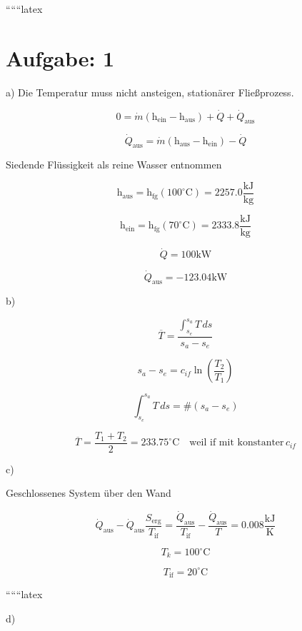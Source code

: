 
``````latex


\section*{Aufgabe: 1}

a) Die Temperatur muss nicht ansteigen, stationärer Fließprozess.

\[
0 = \dot{m} (\text{h}_{\text{ein}} - \text{h}_{\text{aus}}) + \dot{Q} + \dot{Q}_{\text{aus}}
\]

\[
\dot{Q}_{\text{aus}} = \dot{m} (\text{h}_{\text{aus}} - \text{h}_{\text{ein}}) - \dot{Q}
\]

Siedende Flüssigkeit als reine Wasser entnommen

\[
\text{h}_{\text{aus}} = \text{h}_{\text{fg}} (100^\circ \text{C}) = 2257.0 \frac{\text{kJ}}{\text{kg}}
\]

\[
\text{h}_{\text{ein}} = \text{h}_{\text{fg}} (70^\circ \text{C}) = 2333.8 \frac{\text{kJ}}{\text{kg}}
\]

\[
\dot{Q} = 100 \text{kW}
\]

\[
\dot{Q}_{\text{aus}} = -123.04 \text{kW}
\]

b)

\[
\overline{T} = \frac{\int_{s_e}^{s_a} T \, ds}{s_a - s_e}
\]

\[
s_a - s_e = c_{if} \ln \left( \frac{T_2}{T_1} \right)
\]

\[
\int_{s_e}^{s_a} T \, ds = \# (s_a - s_e)
\]

\[
\overline{T} = \frac{T_1 + T_2}{2} = 233.75^\circ \text{C} \quad \text{weil if mit konstanter} \, c_{if}
\]

c)

Geschlossenes System über den Wand

\[
\dot{Q}_{\text{aus}} - \dot{Q}_{\text{aus}} \frac{S_{\text{erg}}}{T_{\text{if}}} = \frac{\dot{Q}_{\text{aus}}}{T_{\text{if}}} - \frac{\dot{Q}_{\text{aus}}}{T} = 0.008 \frac{\text{kJ}}{\text{K}}
\]

\[
T_k = 100^\circ \text{C}
\]

\[
T_{\text{if}} = 20^\circ \text{C}
\]

``````latex


d)

